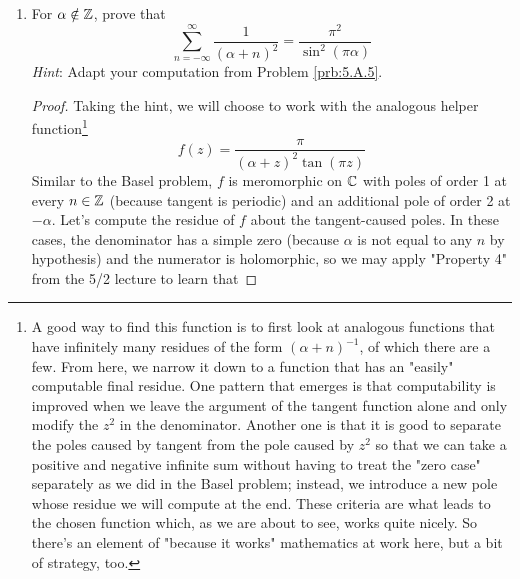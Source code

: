 \documentclass[../psets.tex]{subfiles}
\begin{document}
\begin{enumerate}[ref={A.\arabic*}]
\begin{proof}
        \begin{equation*}
            |f(z)| = \left| \frac{\pi}{z^2}\cot(\pi z) \right|
            \leq \left| \frac{2\pi}{z^2} \right|
            \to 0
        \end{equation*}
        for all $z\in\im(\gamma_N)$. Thus, the integral of $f$ over $\gamma_N$ goes to zero, too. In a statement,
        \begin{equation*}
            \lim_{N\to\infty}\int_{\gamma_N}f\dd{z} = 0
        \end{equation*}
        as desired.
    \end{proof}
    \item For $\alpha\notin\mathbb{Z}$, prove that
    \begin{equation*}
        \sum_{n=-\infty}^\infty\frac{1}{(\alpha+n)^2} = \frac{\pi^2}{\sin^2(\pi\alpha)}
    \end{equation*}
    \emph{Hint}: Adapt your computation from Problem \ref{prb:5.A.5}.
    \begin{proof}
        Taking the hint, we will choose to work with the analogous helper function\footnote{A good way to find this function is to first look at analogous functions that have infinitely many residues of the form $(\alpha+n)^{-1}$, of which there are a few. From here, we narrow it down to a function that has an "easily" computable final residue. One pattern that emerges is that computability is improved when we leave the argument of the tangent function alone and only modify the $z^2$ in the denominator. Another one is that it is good to separate the poles caused by tangent from the pole caused by $z^2$ so that we can take a positive and negative infinite sum without having to treat the "zero case" separately as we did in the Basel problem; instead, we introduce a new pole whose residue we will compute at the end. These criteria are what leads to the chosen function which, as we are about to see, works quite nicely. So there's an element of "because it works" mathematics at work here, but a bit of strategy, too.}
        \begin{equation*}
            f(z) = \frac{\pi}{(\alpha+z)^2\tan(\pi z)}
        \end{equation*}
        Similar to the Basel problem, $f$ is meromorphic on $\mathbb{C}$ with poles of order 1 at every $n\in\mathbb{Z}$ (because tangent is periodic) and an additional pole of order 2 at $-\alpha$. Let's compute the residue of $f$ about the tangent-caused poles. In these cases, the denominator has a simple zero (because $\alpha$ is not equal to any $n$ by hypothesis) and the numerator is holomorphic, so we may apply "Property 4" from the 5/2 lecture to learn that

\end{proof}
\end{enumerate}
\end{document}

